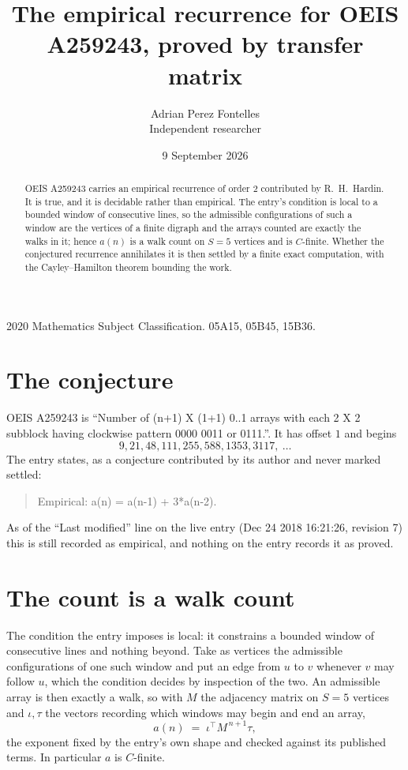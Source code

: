 \documentclass[11pt,a4paper]{article}
\title{The empirical recurrence for OEIS A259243, proved by transfer matrix}
\author{Adrian Perez Fontelles\\ \small Independent researcher}
\date{9 September 2026}
\theoremstyle{plain}
\theoremstyle{definition}
\begin{document}
\maketitle

\begin{abstract}
OEIS A259243 carries an empirical recurrence of order $2$ contributed by R.~H.~Hardin. It is
true, and it is decidable rather than empirical. The entry's condition is local to a bounded window of consecutive lines, so
the admissible configurations of such a window are the vertices of a finite digraph and the
arrays counted are exactly the walks in it; hence $a(n)$ is a walk count on $S=5$ vertices
and is $C$-finite. Whether the conjectured recurrence annihilates it is then settled by a
finite exact computation, with the Cayley--Hamilton theorem bounding the work.
\end{abstract}

\noindent\small 2020 Mathematics Subject Classification. 05A15, 05B45, 15B36.\normalsize

\section{The conjecture}

OEIS A259243 is ``Number of (n+1) X (1+1) 0..1 arrays with each 2 X 2 subblock having clockwise pattern 0000 0011 or 0111.''. It has offset $1$ and begins
\[
9, 21, 48, 111, 255, 588, 1353, 3117,\ \dots
\]
The entry states, as a conjecture contributed by its author and never marked settled:
\begin{quote}
Empirical: a(n) = a(n-1) + 3*a(n-2).
\end{quote}
As of the ``Last modified'' line on the live entry (Dec 24 2018 16:21:26, revision 7) this is still
recorded as empirical, and nothing on the entry records it as proved.

\section{The count is a walk count}

The condition the entry imposes is local: it constrains a bounded window of consecutive lines and nothing beyond. Take as
vertices the admissible configurations of one such window and put an edge from $u$ to $v$
whenever $v$ may follow $u$, which the condition decides by inspection of the two. An
admissible array is then exactly a walk, so with $M$ the adjacency matrix on $S=5$ vertices
and $\iota,\tau$ the vectors recording which windows may begin and end an array,
\[
a(n)\;=\;\iota^{\!\top}M^{\,n+1}\tau ,
\]
the exponent fixed by the entry's own shape and checked against its published terms. In
particular $a$ is $C$-finite.
\end{document}
